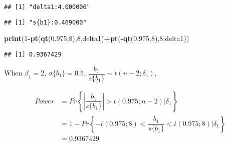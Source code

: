 \documentclass[]{article}
\newenvironment{Shaded}{\begin{snugshade}}{\end{snugshade}}
\newcommand{\KeywordTok}[1]{\textcolor[rgb]{0.13,0.29,0.53}{\textbf{#1}}}
\newcommand{\DecValTok}[1]{\textcolor[rgb]{0.00,0.00,0.81}{#1}}
\newcommand{\FloatTok}[1]{\textcolor[rgb]{0.00,0.00,0.81}{#1}}
\newcommand{\StringTok}[1]{\textcolor[rgb]{0.31,0.60,0.02}{#1}}
\newcommand{\OperatorTok}[1]{\textcolor[rgb]{0.81,0.36,0.00}{\textbf{#1}}}
\newcommand{\NormalTok}[1]{#1}
\begin{document}
\begin{Shaded}
\end{Shaded}

\begin{verbatim}
## [1] "delta1:4.000000"
\end{verbatim}

\begin{Shaded}
\end{Shaded}

\begin{verbatim}
## [1] "s{b1}:0.469000"
\end{verbatim}

\begin{Shaded}
\begin{Highlighting}[]
\KeywordTok{print}\NormalTok{(}\DecValTok{1}\OperatorTok{-}\KeywordTok{pt}\NormalTok{(}\KeywordTok{qt}\NormalTok{(}\FloatTok{0.975}\NormalTok{,}\DecValTok{8}\NormalTok{),}\DecValTok{8}\NormalTok{,delta1)}\OperatorTok{+}\KeywordTok{pt}\NormalTok{(}\OperatorTok{-}\KeywordTok{qt}\NormalTok{(}\FloatTok{0.975}\NormalTok{,}\DecValTok{8}\NormalTok{),}\DecValTok{8}\NormalTok{,delta1))}
\end{Highlighting}
\end{Shaded}

\begin{verbatim}
## [1] 0.9367429
\end{verbatim}

When \(\beta_1=2\), \(\sigma\{b_1\}=0.5\),
\(\dfrac{b_1}{s\{b_1\}}\sim t(n-2;\delta_1)\),

\begin{align*}
Power&=Pr\left\{\left|\dfrac{b_1}{s\{b_1\}}\right|>t(0.975;n-2)\Big|\delta_1\right\}\\
&=1-Pr\left\{-t(0.975;8)<\dfrac{b_1}{s\{b_1\}}<t(0.975;8)\Big|\delta_1\right\}\\
&=0.9367429
\end{align*}
\end{document}
